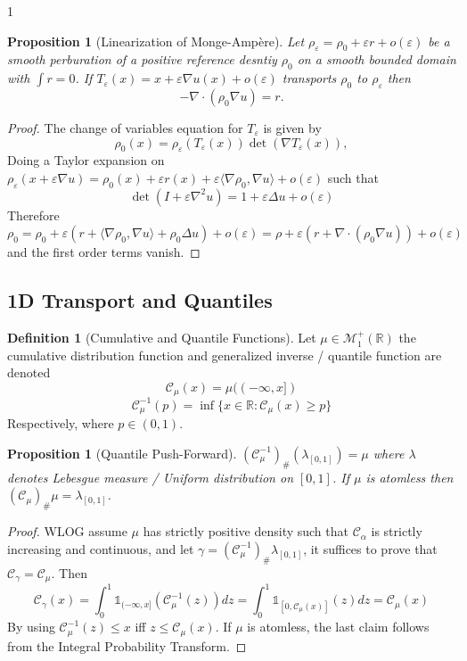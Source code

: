 \documentclass[12pt]{article}
\newtheorem{proposition}[theorem]{Proposition}
\theoremstyle{definition}
\newtheorem{definition}[theorem]{Definition}
\theoremstyle{plain}
\begin{document}
\begin{spacing}{1}
\begin{proposition}[Linearization of Monge-Ampère]
    Let $\rho_\varepsilon = \rho_0 + \varepsilon r + o(\varepsilon)$ be a smooth perburation of a positive reference desntiy $\rho_0$ on a smooth bounded domain with $\int r = 0$. If $T_\varepsilon(x) = x+ \varepsilon\nabla u(x) + o(\varepsilon)$ transports $\rho_0$ to $\rho_\varepsilon$ then 
    \[
    - \nabla \cdot (\rho_0 \nabla u) = r.
    \]
\end{proposition}

\begin{proof}
    The change of variables equation for $T_\varepsilon$ is given by 
    \[
    \rho_0(x) = \rho_\varepsilon(T_\varepsilon(x))\det(\nabla T_\varepsilon(x)),
    \]
    Doing a Taylor expansion on $\rho_\varepsilon(x + \varepsilon \nabla u) = \rho_0(x) + \varepsilon r(x) + \varepsilon\langle\nabla \rho_0, \nabla u \rangle + o(\varepsilon)$ such that 
    \[
    \det(I + \varepsilon \nabla ^2 u) = 1 + \varepsilon \Delta u + o(\varepsilon)
    \]
    Therefore $\rho_0 = \rho_0 + \varepsilon(r + \langle \nabla \rho_0, \nabla u \rangle + \rho_0 \Delta u) + o(\varepsilon) = \rho + \varepsilon(r + \nabla \cdot (\rho_0 \nabla u)) + o(\varepsilon)$ and the first order terms vanish.
\end{proof}

\subsection{1D Transport and Quantiles}
\begin{definition}[Cumulative and Quantile Functions]
    Let $\mu \in \mathcal{M}_1^+(\mathbb{R})$ the cumulative distribution function and generalized inverse / quantile function are denoted
    \[
    \mathcal{C}_\mu(x) = \mu((-\infty, x])
    \]
    \[
    \mathcal{C}_\mu^{-1}(p) = \inf\{x \in \mathbb{R}: \mathcal{C}_\mu(x) \geq p\}
    \]
    Respectively, where $p \in (0, 1)$.
\end{definition}

\begin{proposition}[Quantile Push-Forward]
    $(\mathcal{C}_\mu^{-1})_\#(\lambda_{[0, 1]}) = \mu$ where $\lambda$ denotes Lebesgue measure / Uniform distribution on $[0, 1]$. If $\mu$ is atomless then $(\mathcal{C}_\mu)_\#\mu = \lambda_{[0, 1]}$.
\end{proposition}
\begin{proof}
    WLOG assume $\mu$ has strictly positive density such that $\mathcal{C}_\alpha$ is strictly increasing and continuous, and let $\gamma = (\mathcal{C}_\mu^{-1})_\#\lambda_{[0, 1]}$, it suffices to prove that $\mathcal{C}_\gamma = \mathcal{C}_\mu$. Then
    \[
    \mathcal{C}_\gamma(x) = \displaystyle \int_0^1 \mathds{1}_{(-\infty, x]}(\mathcal{C}_\mu^{-1}(z))dz = \int_0^1 \mathds{1}_{[0, \mathcal{C}_\mu(x)]}(z)dz = \mathcal{C}_\mu(x)
    \]
    By using $\mathcal{C}_\mu^{-1}(z) \leq x$ iff $z \leq \mathcal{C}_\mu(x)$. If $\mu$ is atomless, the last claim follows from the Integral Probability Transform.
\end{proof}


\end{spacing}
\end{document}
